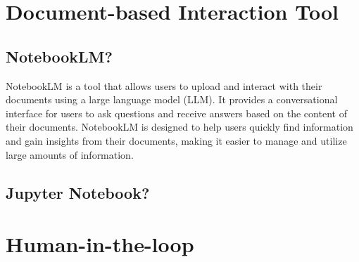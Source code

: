 \section{Document-based Interaction Tool}
\subsection{NotebookLM?}
NotebookLM \cite{NotebookLM} is a tool that allows users to upload and interact with their documents using a large language model (LLM). It provides a conversational interface for users to ask questions and receive answers based on the content of their documents. NotebookLM is designed to help users quickly find information and gain insights from their documents, making it easier to manage and utilize large amounts of information.
\subsection{Jupyter Notebook?}


\section{Human-in-the-loop}